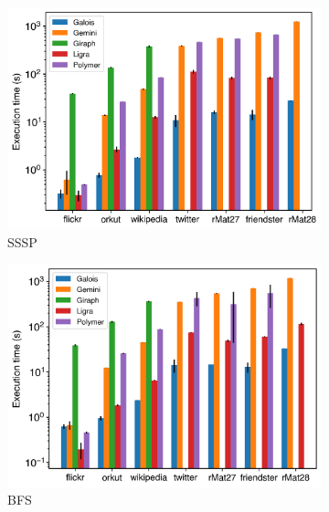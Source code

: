 \documentclass{meetings}
\begin{document}
\begin{figure}[h]
	\begin{subfigure}{0.32\textwidth}
		\includegraphics[width=\linewidth]{../../plots/singleNodeSSSP_execTime.png}
		\caption{SSSP}
		\label{fig:singleNodeSSSP_exec}
	\end{subfigure}
	\begin{subfigure}{0.32\textwidth}
		\includegraphics[width=\linewidth]{../../plots/singleNodeBFS_execTime.png}
		\caption{BFS}
		\label{fig:singleNodeSSSP_exec}
	\end{subfigure}
	\begin{subfigure}{0.32\textwidth}

\end{subfigure}
\end{figure}
\end{document}
